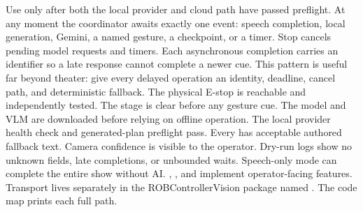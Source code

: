 Use  only after both the local provider and cloud path have\markdownRendererSoftLineBreak
{}passed preflight.\markdownRendererOlItemEnd 
\markdownRendererOlEnd \markdownRendererInterblockSeparator
{}
\markdownRendererSectionEnd \markdownRendererSectionBegin
{}\markdownRendererInterblockSeparator
{}At any moment the coordinator awaits exactly one event: speech completion,\markdownRendererSoftLineBreak
{}local generation, Gemini, a named gesture, a checkpoint, or a timer. Stop\markdownRendererSoftLineBreak
{}cancels pending model requests and timers. Each asynchronous completion carries\markdownRendererSoftLineBreak
{}an identifier so a late response cannot complete a newer cue. This pattern is\markdownRendererSoftLineBreak
{}useful far beyond theater: give every delayed operation an identity, deadline,\markdownRendererSoftLineBreak
{}cancel path, and deterministic fallback.\markdownRendererInterblockSeparator
{}
\markdownRendererSectionEnd \markdownRendererSectionBegin
{}\markdownRendererInterblockSeparator
{}\markdownRendererUlBegin
\markdownRendererUlItem The physical E-stop is reachable and independently tested.\markdownRendererUlItemEnd 
\markdownRendererUlItem The stage is clear before any gesture cue.\markdownRendererUlItemEnd 
\markdownRendererUlItem The model and VLM are downloaded before relying on offline operation.\markdownRendererUlItemEnd 
\markdownRendererUlItem The local provider health check and generated-plan preflight pass.\markdownRendererUlItemEnd 
\markdownRendererUlItem Every  has acceptable authored fallback text.\markdownRendererUlItemEnd 
\markdownRendererUlItem Camera confidence is visible to the operator.\markdownRendererUlItemEnd 
\markdownRendererUlItem Dry-run logs show no unknown fields, late completions, or unbounded waits.\markdownRendererUlItemEnd 
\markdownRendererUlItem Speech-only mode can complete the entire show without AI.\markdownRendererUlItemEnd 
\markdownRendererUlEnd \markdownRendererInterblockSeparator
{}\markdownRendererThematicBreak{}\markdownRendererInterblockSeparator
{}
\markdownRendererSectionEnd 
\markdownRendererSectionEnd \markdownRendererSectionBegin
{}\markdownRendererInterblockSeparator
{}\markdownRendererBlockQuoteBegin
{} , , and  implement operator-facing features. Transport lives separately in the ROBControllerVision package named . The code map prints each full path.\markdownRendererBlockQuoteEnd \markdownRendererInterblockSeparator
